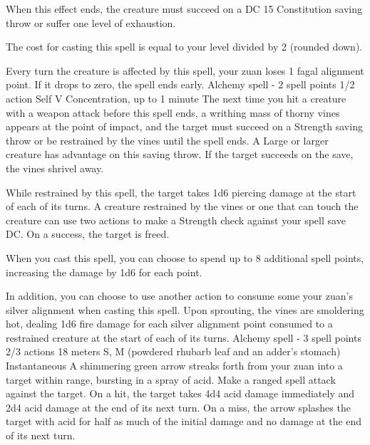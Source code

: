         When this effect ends, the creature must succeed on a DC 15 Constitution saving throw or suffer one level of exhaustion.

        The cost for casting this spell is equal to your level divided by 2 (rounded down).

        Every turn the creature is affected by this spell, your zuan loses 1 fagal alignment point.
        If it drops to zero, the spell ends early.
        {Alchemy spell - 2 spell points}
        {1/2 action}
        {Self}
        {V}
        {Concentration, up to 1 minute}
        The next time you hit a creature with a weapon attack before this spell ends, a writhing mass of thorny vines appears at the point of impact, and the target must succeed on a Strength saving throw or be restrained by the vines until the spell ends.
        A Large or larger creature has advantage on this saving throw.
        If the target succeeds on the save, the vines shrivel away.

        While restrained by this spell, the target takes 1d6 piercing damage at the start of each of its turns.
        A creature restrained by the vines or one that can touch the creature can use two actions to make a Strength check against your spell save DC.
        On a success, the target is freed.

        When you cast this spell, you can choose to spend up to 8 additional spell points, increasing the damage by 1d6 for each point.

        In addition, you can choose to use another action to consume some your zuan's silver alignment when casting this spell.
        Upon sprouting, the vines are smoldering hot, dealing 1d6 fire damage for each silver alignment point consumed to a restrained creature at the start of each of its turns.
        {Alchemy spell - 3 spell points}
        {2/3 actions}
        {18 meters}
        {S, M (powdered rhubarb leaf and an adder's stomach)}
        {Instantaneous}
        A shimmering green arrow streaks forth from your zuan into a target within range, bursting in a spray of acid.
        Make a ranged spell attack against the target.
        On a hit, the target takes 4d4 acid damage immediately and 2d4 acid damage at the end of its next turn.
        On a miss, the arrow splashes the target with acid for half as much of the initial damage and no damage at the end of its next turn.

